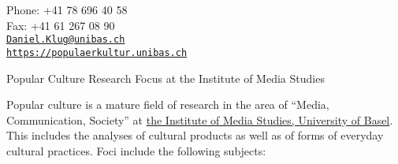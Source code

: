 \documentclass[9pt]{article}
\makeatletter
\def\myemail{Daniel.Klug@unibas.ch}
\def\mywebtext{https://populaerkultur.unibas.ch}
\def\myweb{https://populaerkultur.unibas.ch/home/popularculture-en/}
\def\myfax{+41 61 267 08 90}
\def\myphone{+41 78 696 40 58}
\makeatother
\begin{document}
\begin{minipage}[t]{2.95in}

\end{minipage}
\hfill
\hfill
\begin{minipage}[t]{1.7in}
  \flushright \footnotesize Phone: \myphone \\
  Fax: \myfax  \\
  {\scriptsize  \texttt{\href{mailto:\myemail}{\myemail}}} \\
  {\scriptsize  \vspace{-0.03in} \texttt{\href{\myweb}{\mywebtext}}}
\end{minipage}


\medskip

\reversemarginpar

\bigskip\bigskip



\noindent\textsf{\large Popular Culture Research Focus at the Institute of Media Studies}
\smallskip

\noindent Popular culture is a mature field of research in the area of ``Media, Communication, Society'' at \href{http://mewi.unibas.ch/}{the Institute of Media Studies, University of Basel}. This includes the analyses of cultural products as well as of forms of everyday cultural practices. Foci include the following subjects:
\end{document}
